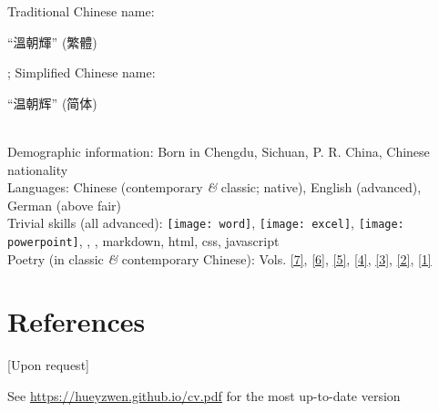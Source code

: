 \documentclass[10pt]{article}
\begin{document}
Traditional Chinese name: \begin{CJK}{UTF8}{fs}``溫朝輝'' (繁體)\end{CJK}; Simplified Chinese name: \begin{CJK}{UTF8}{fs}``温朝辉'' (简体)\end{CJK}\\
Demographic information: Born in Chengdu, Sichuan, P. R. China, Chinese nationality\\
Languages: Chinese (contemporary \emph{\&} classic; native), English (advanced), German (above fair)\\
Trivial skills (all advanced): \texttt{[image: word]}, \texttt{[image: excel]}, \texttt{[image: powerpoint]}, , , markdown, html, css, javascript\\
Poetry (in classic \emph{\&} contemporary Chinese): Vols. \href{https://hueyzwen.github.io/poetry/潜庵歌诗长短句类编删定注.pdf}{[7]}, \href{https://hueyzwen.github.io/poetry/椇貝女化了草.pdf}{[6]}, \href{https://hueyzwen.github.io/poetry/麻雀、蜻蜓和草.pdf}{[5]}, \href{https://hueyzwen.github.io/poetry/湖山不负斋诗词草.pdf}{[4]}, \href{https://hueyzwen.github.io/poetry/魁北克冷雨.pdf}{[3]}, \href{https://hueyzwen.github.io/poetry/残山编.pdf}{[2]}, \href{https://hueyzwen.github.io/poetry/羽囚.pdf}{[1]}

\section*{References}

[Upon request]

\vspace*{\fill}\hspace*{\fill}\small{See \href{https://hueyzwen.github.io/cv.pdf}{https://hueyzwen.github.io/cv.pdf} for the most up-to-date version}
\end{document}
